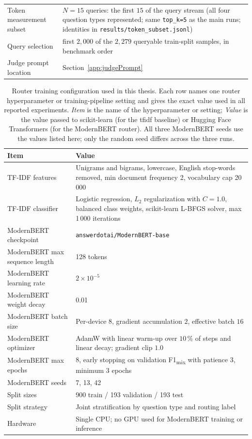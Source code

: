 \documentclass[english, bibtex]{kththesis}               %
\numberwithin{listing}{chapter}
\begin{document}
\begin{table}[!ht]
\begin{tabularx}{\textwidth}{p{}|X}
Token measurement subset & \(N = 15\) queries: the first $15$ of the query stream (all four question types represented; same \texttt{top\_k=5} as the main runs; identities in \texttt{results/token\_subset.jsonl}) \\
Query selection & first $2{,}000$ of the $2{,}279$ queryable train-split samples, in benchmark order \\
Judge prompt location & Section~\ref{app:judgePrompt} \\
\end{tabularx}
\end{table}

\begin{table}[!ht]
\centering
\caption[Router training configuration]{Router training configuration used in this thesis. Each row names one router hyperparameter or training-pipeline setting and gives the exact value used in all reported experiments. \emph{Item} is the name of the hyperparameter or setting; \emph{Value} is the value passed to scikit-learn (for the \gls{tfidf} baseline) or Hugging Face Transformers (for the ModernBERT router). All three ModernBERT seeds use the values listed here; only the random seed differs across the three runs.}
\label{tab:routerTrainingConfig}
\begin{tabularx}{\textwidth}{p{}|X}
\textbf{Item} & \textbf{Value} \\
\hline
TF-IDF features & Unigrams and bigrams, lowercase, English stop-words removed, min document frequency 2, vocabulary cap 20\,000 \\
TF-IDF classifier & Logistic regression, $L_2$ regularization with $C=1.0$, balanced class weights, scikit-learn L-BFGS solver, max 1\,000 iterations \\
ModernBERT checkpoint & \texttt{answerdotai/ModernBERT-base} \\
ModernBERT max sequence length & 128 tokens \\
ModernBERT learning rate & $2 \times 10^{-5}$ \\
ModernBERT weight decay & 0.01 \\
ModernBERT batch size & Per-device $8$, gradient accumulation $2$, effective batch $16$ \\
ModernBERT optimizer & AdamW with linear warm-up over $10\,\%$ of steps and linear decay; gradient clip $1.0$ \\
ModernBERT max epochs & 8, early stopping on validation F1\textsubscript{mix} with patience 3, minimum 3 epochs \\
ModernBERT seeds & 7, 13, 42 \\
Split sizes & 900 train / 193 validation / 193 test \\
Split strategy & Joint stratification by question type and routing label \\
Hardware & Single CPU; no GPU used for ModernBERT training or inference \\
\end{tabularx}
\end{table}
\end{document}
